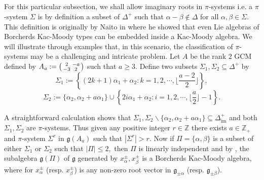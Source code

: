 \documentclass[12pt,reqno]{amsart}
\theoremstyle{plain}
\theoremstyle{definition}
\theoremstyle{remark}
\newcommand{\lie}[1]{\mathfrak{#1}}
\newcommand\bz{\mathbb Z}
\begin{document}
\subsection{}\label{borcherds} For this particular subsection, we shall allow imaginary roots in $\pi$-systems i.e. a $\pi$-system $\Sigma$ is by definition a subset of $\Delta^+$ such that $\alpha-\beta\notin\Delta$ for all $\alpha,\beta\in \Sigma.$ This definition is originally by Naito in \cite{naito1992regular} where he showed that even Lie algebras of Borcherds Kac-Moody types can be embedded inside a Kac-Moody algebra. We will illustrate through examples that, in this scenario, the classification of $\pi$-systems may be a challenging and intricate problem. Let $A$ be the rank $2$ GCM defined by $A_a:=\begin{psmallmatrix}
    2& -a\\ -3& 2
\end{psmallmatrix}$ such that $a\geq 3.$ Define two subsets $\Sigma_1,\Sigma_2\subseteq \Delta^+$ by $$\Sigma_1:=\left\{(2k+1)\alpha_1+\alpha_2:k=1,2,\cdots,\bigg\lfloor\frac{a-2}{2}\bigg\rfloor\right\},$$
$$\Sigma_2:=\{\alpha_2,\alpha_2+a\alpha_1\}\cup\left\{2i\alpha_1+\alpha_2:i=1,2,\cdots,\bigg\lfloor \frac{a}{2}\bigg\rfloor-1\right\}.$$

A straightforward calculation shows that $\Sigma_1,\Sigma_2\backslash\{\alpha_2,\alpha_2+a\alpha_1\}\subseteq \Delta^+_{\mathrm{im}}$ and both $\Sigma_1,\Sigma_2$ are $\pi$-systems. Thus given any positive integer $r\in\bz$ there exists $a\in\bz_+$ and $\pi$-system $\Sigma^{r}$ in $\lie g(A_a)$ such that $|\Sigma^{r}|>r.$ Now if $\Pi=\{\alpha,\beta\}$ is a subset of either $\Sigma_1$ or $\Sigma_2$ such that $|\Pi|\le 2,$ then $\Pi$ is linearly independent and by \cite{naito1992regular}, the subalgebra $\lie g(\Pi)$ of $\lie g$ generated by $x_{\alpha}^\pm,x_{\beta}^\pm$ is a Borcherds Kac-Moody algebra, where for $x_{\alpha}^\pm$ (resp. $x_{\beta}^\pm$) is any non-zero root vector in $\lie g_{\pm \alpha}$ (resp. $\lie g_{\pm\beta}$).
\end{document}
